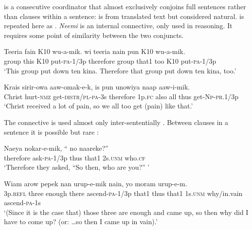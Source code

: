  is a consecutive coordinator that almost exclusively conjoins full sentences rather than clauses within a sentence:  is from translated text but considered natural.  is repeated here as . \textit{Neemi} is an internal connective, only used in reasoning. It requires some point of similarity between the two conjuncts.

\ea%
\label{ex:8:x1904}
\gll Teeria  fain  K10  wu-a-mik.    wi  teeria  nain  pun K10  wu-a-mik.\\
group  this  K10  put-\textsc{pa}-1/3p  therefore  group  that1  too K10  put-\textsc{pa}-1/3p\\
\glt`This group put down ten kina. Therefore that group put down ten kina, too.'
\z
{}


\ea%
\label{ex:8:x1409}
\gll Krais  sirir-owa  aaw-omak-e-k,    is  pun unowiya  naap  aaw-i-mik.\\
Christ  hurt-\textsc{nmz} get-\textsc{distr}/\textsc{pl}-\textsc{pa}-3s  therefore  1p.\textsc{fc} also all  thus  get-\textsc{Np}-\textsc{pr}.1/3p\\
\glt`Christ received a lot of pain, so we all too get (pain) like that.'
\z


The connective  is used almost only inter-sententially . Between clauses in a sentence it is possible but rare :

\ea%
\label{ex:8:x1905}
\gll Naeya  nokar-e-mik, ``    no  naareke?'' \\
therefore  ask-\textsc{pa}-1/3p  thus  that1  2s.\textsc{unm}  who.\textsc{cf}\\
\glt`Therefore they asked, ``So then, who are you?'' '
\z


\ea%
\label{ex:8:x1424}
\gll Wiam  arow  pepek  nan  urup-e-mik  nain,     yo  moram  urup-e-m. \\
3p.\textsc{refl} three  enough  there  ascend-\textsc{pa}-1/3p  that1 thus  that1  1s.\textsc{unm} why/in.vain ascend-\textsc{pa}-1s    \\
\glt`(Since it is the case that) those three are enough and came up, so then why did I have to come up? (or: {\dots}so then I came up in vain).'
\z


